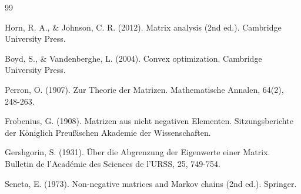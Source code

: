 \documentclass[a4paper,12pt]{article}
\theoremstyle{definition}
\begin{document}
\begin{thebibliography}{99}

Horn, R. A., \& Johnson, C. R. (2012). Matrix analysis (2nd ed.). Cambridge University Press.

Boyd, S., \& Vandenberghe, L. (2004). Convex optimization. Cambridge University Press.

Perron, O. (1907). Zur Theorie der Matrizen. Mathematische Annalen, 64(2), 248-263.

Frobenius, G. (1908). Matrizen aus nicht negativen Elementen. Sitzungsberichte der Königlich Preußischen Akademie der Wissenschaften.

Gershgorin, S. (1931). Über die Abgrenzung der Eigenwerte einer Matrix. Bulletin de l'Académie des Sciences de l'URSS, 25, 749-754.

Seneta, E. (1973). Non-negative matrices and Markov chains (2nd ed.). Springer.

\end{thebibliography}
\end{document}
